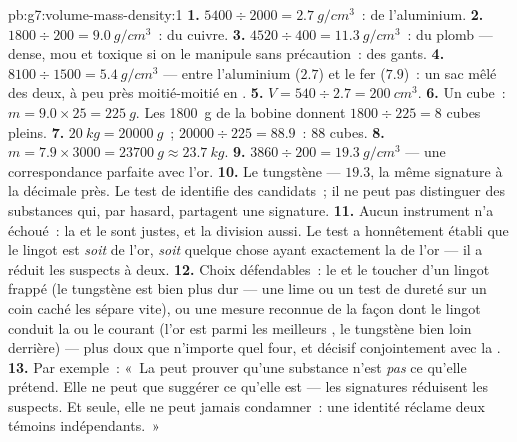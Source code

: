 \begin{solution}{pb:g7:volume-mass-density:1}
\textbf{1.} $5400 \div 2000 = \qty{2.7}{g/cm^3}$~: de l'aluminium.
\textbf{2.} $1800 \div 200 = \qty{9.0}{g/cm^3}$~: du cuivre.
\textbf{3.} $4520 \div 400 = \qty{11.3}{g/cm^3}$~: du plomb ---
dense, mou et toxique si on le manipule sans précaution~: des gants.
\textbf{4.} $8100 \div 1500 = \qty{5.4}{g/cm^3}$ --- entre
l'aluminium ($2.7$) et le fer ($7.9$)~: un sac mêlé des deux, à peu
près moitié-moitié en .
\textbf{5.} $V = 540 \div 2.7 = \qty{200}{cm^3}$.
\textbf{6.} Un cube~: $m = 9.0 \times 25 = \qty{225}{g}$. Les
\qty{1800}{g} de la bobine donnent $1800 \div 225 = 8$ cubes pleins.
\textbf{7.} $\qty{20}{kg} = \qty{20000}{g}$~;
$20000 \div 225 = 88.9$~: $88$ cubes.
\textbf{8.} $m = 7.9 \times 3000 = \qty{23700}{g} \approx
\qty{23.7}{kg}$.
\textbf{9.} $3860 \div 200 = \qty{19.3}{g/cm^3}$ --- une
correspondance parfaite avec l'or.
\textbf{10.} Le tungstène ---  $19.3$, la même
signature à la décimale près. Le test de  identifie
des candidats~; il ne peut pas distinguer des substances qui, par
hasard, partagent une signature.
\textbf{11.} Aucun instrument n'a échoué~: la  et le  sont
justes, et la division aussi. Le test a honnêtement établi que le
lingot est \emph{soit} de l'or, \emph{soit} quelque chose ayant
exactement la  de l'or --- il a réduit les suspects à
deux.
\textbf{12.} Choix défendables~: le  et le toucher d'un lingot
frappé (le tungstène est bien plus dur --- une lime ou un test de
dureté sur un coin caché les sépare vite), ou une mesure reconnue de
la façon dont le lingot conduit la  ou le courant (l'or est
parmi les meilleurs , le tungstène bien loin derrière) ---
plus doux que n'importe quel four, et décisif conjointement avec la
.
\textbf{13.} Par exemple~: «~La  peut prouver qu'une
substance n'est \emph{pas} ce qu'elle prétend. Elle ne peut que
suggérer ce qu'elle est --- les signatures réduisent les suspects. Et
seule, elle ne peut jamais condamner~: une identité réclame deux
témoins indépendants.~»
\end{solution}
